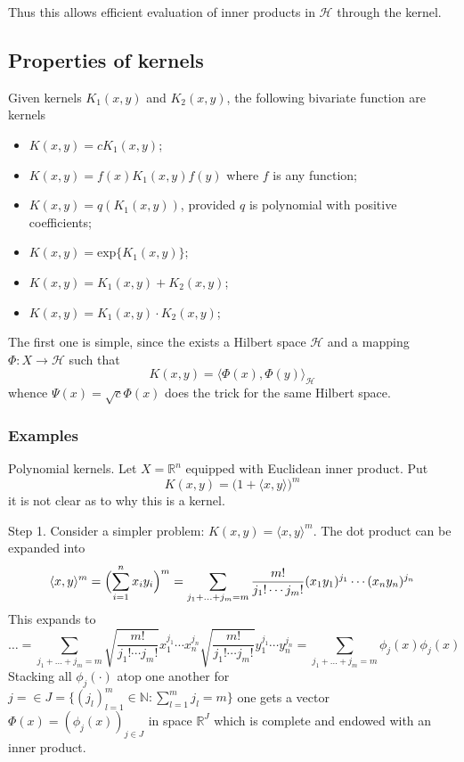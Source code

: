 \documentclass[a4paper]{article}
\newcommand{\Real}{\mathbb{R}}
\newcommand{\Hcal}{\mathcal{H}}
\begin{document}
Thus this allows efficient evaluation of inner products in $\Hcal$ through the kernel.


\subsection{Properties of kernels} %
\label{sub:properties_of_kernels}

Given kernels $K_1(x,y)$ and $K_2(x,y)$, the following bivariate function are kernels\begin{itemize}
	\item $K(x,y) = c K_1(x,y)$;
	\item $K(x,y) = f(x) K_1(x,y) f(y)$ where $f$ is any function;
	\item $K(x,y) = q( K_1(x,y) )$, provided $q$ is polynomial with positive coefficients;
	\item $K(x,y) = \text{exp}\{ K_1(x,y) \}$;
	\item $K(x,y) = K_1(x,y) + K_2(x,y)$;
	\item $K(x,y) = K_1(x,y) \cdot K_2(x,y)$;
\end{itemize}
The first one is simple, since the exists a Hilbert space $\Hcal$ and a mapping
$\Phi:X\to \Hcal$ such that
\[ K(x,y) = \bigl\langle \Phi(x), \Phi(y) \bigr\rangle_\Hcal \]
whence $\Psi(x) = \sqrt{c} \Phi(x)$ does the trick for the same Hilbert space.


\subsubsection{Examples} %
\label{ssub:examples}

Polynomial kernels. Let $X=\Real^n$ equipped with Euclidean inner product. Put
\[ K(x,y) = \bigl(1+\langle x, y \rangle \bigr)^m \]
it is not clear as to why this is a kernel.

Step 1. Consider a simpler problem: $K(x,y) = \langle x, y \rangle^m$. The dot product
can be expanded into
\[
\langle x, y \rangle^m
= \Bigl(\sum_{i=1}^n x_i y_i\Bigr)^m
= \sum_{j_1+\ldots+j_m = m} \frac{m!}{j_1!\cdots j_m!} (x_1 y_1)^{j_1}\cdots (x_n y_n)^{j_n}
\]
This expands to
\[
\ldots 
= \sum_{j_1+\ldots+j_m = m} \sqrt{\frac{m!}{j_1!\cdots j_m!}} x_1^{j_1}\cdots x_n^{j_n} \sqrt{\frac{m!}{j_1!\cdots j_m!}} y_1^{j_1}\cdots y_n^{j_n}
= \sum_{j_1+\ldots+j_m = m} \phi_j(x) \phi_j(x)
\]
Stacking all $\phi_j(\cdot)$ atop one another for $j=\in J = \{(j_l)_{l=1}^m \in \mathbb{N}:\sum_{l=1}^m j_l = m\}$
one gets a vector $\Phi(x) = (\phi_j(x))_{j\in J}$ in space $\Real^J$ which is
complete and endowed with an inner product.
\end{document}
